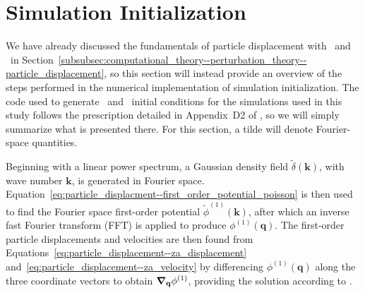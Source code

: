 
%
%

\section{Simulation Initialization}
\label{sec:initialization}



We have already discussed the fundamentals of particle displacement with \za\ and \lpt\ in Section~\ref{subsubsec:computational_theory--perturbation_theory--particle_displacement}, so this section will instead provide an overview of the steps performed in the numerical implementation of simulation initialization.  The code used to generate \za\ and \lpt\ initial conditions for the simulations used in this study follows the prescription detailed in Appendix~D2 of \citet{1998MNRAS.299.1097S}, so we will simply summarize what is presented there.  For this section, a tilde will denote Fourier-space quantities.

Beginning with a linear power spectrum, a Gaussian density field $\tilde{\delta}(\mathbf{k})$, with wave number $\mathbf{k}$, is generated in Fourier space.  Equation~\ref{eq:particle_displacment--first_order_potential_poisson} is then used to find the Fourier space first-order potential $\tilde{\phi}^{(1)}(\mathbf{k})$, after which an inverse fast Fourier transform (FFT) is applied to produce $\phi^{(1)}(\mathbf{q})$.  The first-order particle displacements and velocities are then found from Equations~\ref{eq:particle_displacement--za_displacement} and~\ref{eq:particle_displacement--za_velocity} by differencing $\phi^{(1)}(\mathbf{q})$ along the three coordinate vectors to obtain ${\boldsymbol{\nabla}}_{\mathbf{q}} \phi^{(1)}$, providing the solution according to \za.

